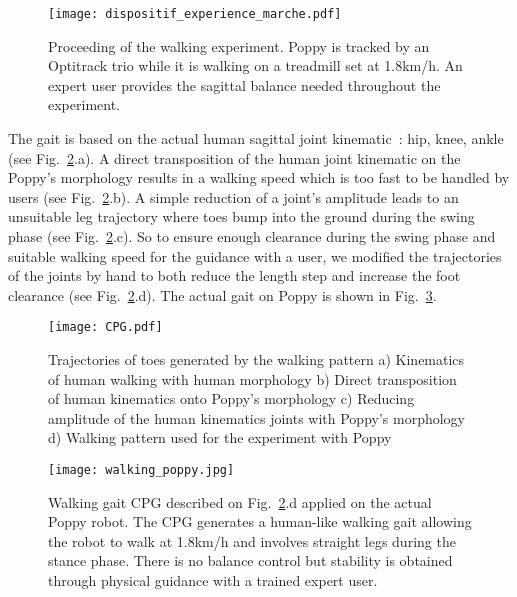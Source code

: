 \begin{figure}[tb]
    \centering
    \texttt{[image: dispositif\_experience\_marche.pdf]}
    \caption{Proceeding of the walking experiment.
    Poppy is tracked by an Optitrack trio while it is walking on a treadmill set at 1.8km/h.
    An expert user provides the sagittal balance needed throughout the experiment.}
    \label{fig:walking_experiment}
\end{figure}


The gait is based on the actual human sagittal joint kinematic~\cite{Nester2003}: hip, knee, ankle (see Fig.~\ref{fig:CPG}.a). A direct transposition of the human joint kinematic on the Poppy's morphology results in a walking speed which is too fast to be handled by users (see Fig.~\ref{fig:CPG}.b). A simple reduction of a joint’s amplitude leads to an unsuitable leg trajectory where toes bump into the ground during the swing phase (see Fig.~\ref{fig:CPG}.c). So to ensure enough clearance during the swing phase and suitable walking speed for the guidance with a user, we modified the trajectories of the joints by hand to both reduce the length step and increase the foot clearance (see Fig.~\ref{fig:CPG}.d). The actual gait on Poppy is shown in Fig.~\ref{fig:humanoids2013_cpg_on_poppy}.


\begin{figure}[tb]
    \centering
    \texttt{[image: CPG.pdf]}
    \caption{Trajectories of toes generated by the walking pattern a) Kinematics of human walking
    with human morphology b) Direct transposition of human kinematics onto Poppy's morphology
    c) Reducing amplitude of the human kinematics joints with Poppy's morphology d) Walking pattern
    used for the experiment with Poppy}
    \label{fig:CPG}
\end{figure}

\begin{figure}[tb]
    \centering
    \texttt{[image: walking\_poppy.jpg]}
    \caption{Walking gait CPG described on Fig.~\ref{fig:CPG}.d applied on the actual Poppy robot.
    The CPG generates a human-like walking gait allowing the robot to walk at 1.8km/h and involves straight legs during the stance phase.
    There is no balance control but stability is obtained through physical guidance with a trained expert user.}
    \label{fig:humanoids2013_cpg_on_poppy}
\end{figure}

